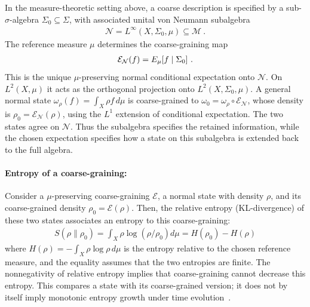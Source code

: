 \documentclass[a4paper,11pt]{article}
\theoremstyle{definition}
\newcommand{\mN}{\mathcal{N}}
\newcommand{\mM}{\mathcal{M}}
\newcommand{\mE}{\mathcal{E}}
\begin{document}
In the measure-theoretic setting above, a coarse description is specified by a sub-$\sigma$-algebra $\Sigma_0\subseteq\Sigma$, with associated unital von Neumann subalgebra
\begin{align}
    \mN=L^\infty(X,\Sigma_0,\mu)\subseteq\mM\ .
\end{align}
The reference measure $\mu$ determines the coarse-graining map
\begin{align}
    \mE_{\mN}(f)=\mathbb \mE_\mu[f\mid\Sigma_0]\ .
\end{align}
This is the unique $\mu$-preserving normal conditional expectation onto $\mN$. On $L^2(X,\mu)$ it acts as the orthogonal projection onto $L^2(X,\Sigma_0,\mu)$. A general normal state $\omega_\rho(f)=\int_X\rho f\,d\mu$ is coarse-grained to $\omega_0=\omega_\rho\circ \mE_{\mN}$, whose density is $\rho_0=\mE_{\mN}(\rho)$, using the $L^1$ extension of conditional expectation. The two states agree on $\mN$. Thus the subalgebra specifies the retained information, while the chosen expectation specifies how a state on this subalgebra is extended back to the full algebra.


\paragraph{Entropy of a coarse-graining:} Consider a $\mu$-preserving coarse-graining $\mE$, a normal state with density $\rho$, and its coarse-grained density $\rho_0=\mE(\rho)$. Then, the relative entropy (KL-divergence) of these two states associates an entropy to this coarse-graining:
\begin{align}
    \label{eq:KL-classical}
    S(\rho\|\rho_0)=\int_X \rho \log(\rho/\rho_0)d\mu=H(\rho_0)-H(\rho)
\end{align}
where $H(\rho)=-\int_X\rho\log\rho\,d\mu$ is the entropy relative to the chosen reference measure, and the equality assumes that the two entropies are finite. The nonnegativity of relative entropy implies that coarse-graining cannot decrease this entropy. This compares a state with its coarse-grained version; it does not by itself imply monotonic entropy growth under time evolution~\cite{Lashkari2019EntanglementScale}.
\end{document}
